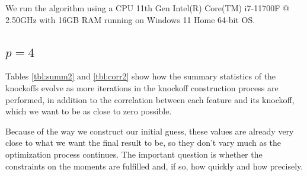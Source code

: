 \documentclass[review]{elsarticle}
\begin{document}
We run the algorithm using a CPU 11th Gen Intel(R) Core(TM) i7-11700F @ 2.50GHz with 16GB RAM running on Windows 11 Home 64-bit OS.
%
%

\subsection*{\underline{$p=4$}}

Tables \ref{tbl:summ2} and \ref{tbl:corr2} show how the summary statistics of the knockoffs evolve as more iterations in the knockoff construction process are performed, in addition to the correlation between each feature and its knockoff, which we want to be as close to zero possible.

Because of the way we construct our initial guess, these values are already very close to what we want the final result to be, so they don't vary much as the optimization process continues. The important question is whether the constraints on the moments are fulfilled and, if so, how quickly and how precisely.
\end{document}
